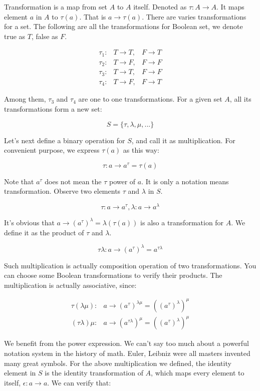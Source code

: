 \documentclass{article}
\begin{document}
Transformation is a map from set $A$ to $A$ itself. Denoted as $\tau : A \to A$. It maps element $a$ in $A$ to $\tau(a)$. That is $a \to \tau(a)$. There are varies transformations for a set. The following are all the transformations for Boolean set, we denote true as $T$, false as $F$.

\[
\begin{array}{rll}
\tau_1 : & T \to T, & F \to T \\
\tau_2 : & T \to F, & F \to F \\
\tau_3 : & T \to T, & F \to F \\
\tau_4 : & T \to F, & F \to T
\end{array}
\]

Among them, $\tau_3$ and $\tau_4$ are one to one transformations. For a given set $A$, all its transformations form a new set:

\[
S = \{\tau, \lambda, \mu, ...\}
\]

Let's next define a binary operation for $S$, and call it as multiplication. For convenient purpose, we express $\tau(a)$ as this way:

\[
\tau: a \to a^\tau = \tau(a)
\]

Note that $a^\tau$ does not mean the $\tau$ power of $a$. It is only a notation means transformation. Observe two elements $\tau$ and $\lambda$ in $S$.

\[
\tau: a \to a^\tau,  \lambda: a \to a^\lambda
\]

It's obvious that $a \to (a^\tau)^\lambda = \lambda(\tau(a))$ is also a transformation for $A$. We define it as the product of $\tau$ and $\lambda$.

\[
\tau\lambda: a \to (a^\tau)^\lambda = a^{\tau\lambda}
\]

Such multiplication is actually composition operation of two transformations. You can choose some Boolean transformations to verify their products. The multiplication is actually associative, since:

\[
\begin{array}{rl}
\tau(\lambda\mu): & a \to (a^\tau)^{\lambda\mu} = ((a^\tau)^\lambda)^\mu \\
(\tau\lambda)\mu: & a \to (a^{\tau\lambda})^\mu = ((a^\tau)^\lambda)^\mu
\end{array}
\]

We benefit from the power expression. We can't say too much about a powerful notation system in the history of math. Euler, Leibniz were all masters invented many great symbols. For the above multiplication we defined, the identity element in $S$ is the identity transformation of $A$, which maps every element to itself, $\epsilon: a \to a$. We can verify that:
\end{document}
